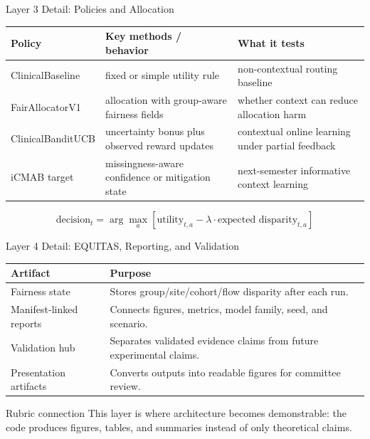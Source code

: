 \begin{frame}{Layer 3 Detail: Policies and Allocation}
\small
\begin{tabular}{p{}p{}p{}}
\toprule
Policy & Key methods / behavior & What it tests \\
\midrule
ClinicalBaseline & fixed or simple utility rule & non-contextual routing baseline \\
FairAllocatorV1 & allocation with group-aware fairness fields & whether context can reduce allocation harm \\
ClinicalBanditUCB & uncertainty bonus plus observed reward updates & contextual online learning under partial feedback \\
iCMAB target & missingness-aware confidence or mitigation state & next-semester informative context learning \\
\bottomrule
\end{tabular}
\vspace{0.5em}
\begin{equation*}
\text{decision}_t = \arg\max_a \left[\text{utility}_{t,a} - \lambda \cdot \text{expected disparity}_{t,a}\right]
\end{equation*}
\end{frame}

\begin{frame}{Layer 4 Detail: EQUITAS, Reporting, and Validation}
\small
\begin{tabular}{p{}p{}}
\toprule
Artifact & Purpose \\
\midrule
Fairness state & Stores group/site/cohort/flow disparity after each run. \\
Manifest-linked reports & Connects figures, metrics, model family, seed, and scenario. \\
Validation hub & Separates validated evidence claims from future experimental claims. \\
Presentation artifacts & Converts outputs into readable figures for committee review. \\
\bottomrule
\end{tabular}
\vspace{0.5em}
\begin{block}{Rubric connection}
This layer is where architecture becomes demonstrable: the code produces figures, tables, and summaries instead of only theoretical claims.
\end{block}
\end{frame}
